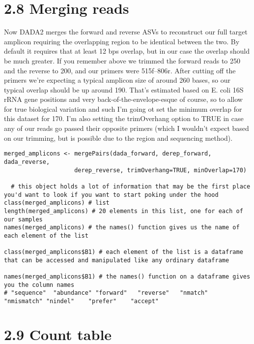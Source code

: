\documentclass[
]{book}
\begin{document}
\hypertarget{merging-reads}{%
\section{2.8 Merging reads}\label{merging-reads}}

Now DADA2 merges the forward and reverse ASVs to reconstruct our full target amplicon requiring the overlapping region to be identical between the two. By default it requires that at least 12 bps overlap, but in our case the overlap should be much greater. If you remember above we trimmed the forward reads to 250 and the reverse to 200, and our primers were 515f--806r. After cutting off the primers we're expecting a typical amplicon size of around 260 bases, so our typical overlap should be up around 190. That's estimated based on E. coli 16S rRNA gene positions and very back-of-the-envelope-esque of course, so to allow for true biological variation and such I'm going ot set the minimum overlap for this dataset for 170. I'm also setting the trimOverhang option to TRUE in case any of our reads go passed their opposite primers (which I wouldn't expect based on our trimming, but is possible due to the region and sequencing method).

\begin{verbatim}
merged_amplicons <- mergePairs(dada_forward, derep_forward, dada_reverse,
                    derep_reverse, trimOverhang=TRUE, minOverlap=170)

  # this object holds a lot of information that may be the first place you'd want to look if you want to start poking under the hood
class(merged_amplicons) # list
length(merged_amplicons) # 20 elements in this list, one for each of our samples
names(merged_amplicons) # the names() function gives us the name of each element of the list 

class(merged_amplicons$B1) # each element of the list is a dataframe that can be accessed and manipulated like any ordinary dataframe

names(merged_amplicons$B1) # the names() function on a dataframe gives you the column names
# "sequence"  "abundance" "forward"   "reverse"   "nmatch"    "nmismatch" "nindel"    "prefer"    "accept"
\end{verbatim}

\hypertarget{count-table}{%
\section{2.9 Count table}\label{count-table}}
\end{document}
